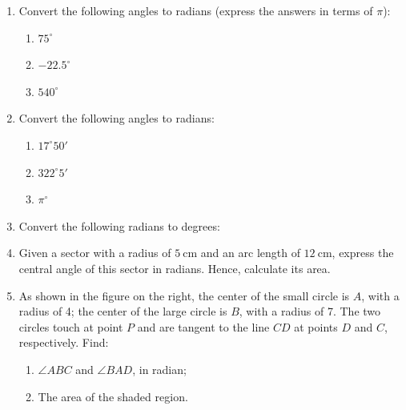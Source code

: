 \documentclass{report}
\begin{document}
\begin{enumerate}
	\item Convert the following angles to radians (express the answers in terms of $\pi$):
	      \begin{multicols}{3}
	      	\begin{enumerate}
	      		\item $75^\circ$
	      		\item $-22.5^\circ$
	      		\item $540^\circ$
	      	\end{enumerate}
	      \end{multicols}
	      
	\item Convert the following angles to radians:
	      \begin{multicols}{3}
	      	\begin{enumerate}
	      		\item $17^\circ 50'$
	      		\item $322^\circ 5'$
	      		\item $\pi^\circ$
	      	\end{enumerate}
	      \end{multicols}
	      
	\item Convert the following radians to degrees:
	      \begin{enumerate}
	      	\begin{multicols}{3}
	      		\item $\dfrac{7 \pi}{4}$
	      		\item $-2.5$
	      		\item $\dfrac{5 \pi}{9}$
	      	\end{multicols}
	      \end{enumerate}
	      
	\item Given a sector with a radius of $5 \mathrm{~cm}$ and an arc length of $12 \mathrm{~cm}$, express the central angle of this sector in radians. Hence, calculate its area.
	          
	\item \begin{multicols}{2}
	      As shown in the figure on the right, the center of the small circle is $A$, with a radius of 4; the center of the large circle is $B$, with a radius of 7. The two circles touch at point $P$ and are tangent to the line $CD$ at points $D$ and $C$, respectively. Find:
	      \begin{enumerate}
	      	\item $\angle ABC$ and $\angle BAD$, in radian;
	      	\item The area of the shaded region.
	      \end{enumerate}
	      

\end{multicols}
\end{enumerate}
\end{document}
